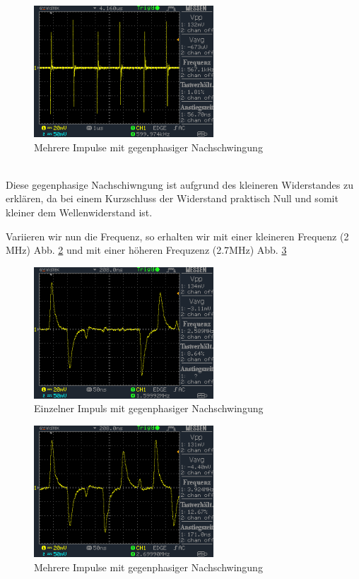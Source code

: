 \documentclass[a4paper,10pt]{article}
\numberwithin{equation}{section}
\begin{document}
\begin{figure}[h]
        \centering
        \includegraphics[width=0.6\textwidth]{data/DS0022.BMP.png}
        \caption{Mehrere Impulse mit gegenphasiger Nachschwingung}
		\label{fig:3.7}
\end{figure}\\
Diese gegenphasige Nachschiwngung ist aufgrund des kleineren Widerstandes zu erklären, da bei einem Kurzschluss der Widerstand praktisch Null und somit kleiner dem Wellenwiderstand ist. 

Variieren wir nun die Frequenz, so erhalten wir mit einer kleineren Frequenz (2 MHz) Abb. \ref{fig:3.8} und mit einer höheren Frequzenz (2.7MHz) Abb. \ref{fig:3.9}
\begin{figure}[h]
        \centering
        \includegraphics[width=0.6\textwidth]{data/DS0024.BMP.png}
        \caption{Einzelner Impuls mit gegenphasiger Nachschwingung}
		\label{fig:3.8}
\end{figure}
\begin{figure}[h]
        \centering
        \includegraphics[width=0.6\textwidth]{data/DS0025.BMP.png}
        \caption{Mehrere Impulse mit gegenphasiger Nachschwingung}
		\label{fig:3.9}
\end{figure}
\end{document}
